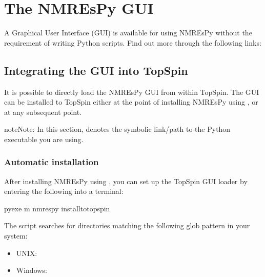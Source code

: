 \documentclass[letterpaper,10pt,english]{sphinxmanual}
\begin{document}
\chapter{The NMR\sphinxhyphen{}EsPy GUI}
\label{\detokenize{gui/index:the-nmr-espy-gui}}\label{\detokenize{gui/index::doc}}
\sphinxAtStartPar
A Graphical User Interface (GUI) is available for using NMR\sphinxhyphen{}EsPy without
the requirement of writing Python scripts. Find out more through the following
links:




\section{Integrating the GUI into TopSpin}
\label{\detokenize{gui/topspin_install:integrating-the-gui-into-topspin}}\label{\detokenize{gui/topspin_install::doc}}
\sphinxAtStartPar
It is possible to directly load the NMR\sphinxhyphen{}EsPy GUI from within TopSpin. The GUI
can be installed to TopSpin either at the point of installing NMR\sphinxhyphen{}EsPy using
, or at any subsequent point.

\begin{sphinxadmonition}{note}{Note:}
\sphinxAtStartPar
In this section,  denotes the symbolic link/path to the Python
executable you are using.
\end{sphinxadmonition}


\subsection{Automatic installation}
\label{\detokenize{gui/topspin_install:automatic-installation}}
\sphinxAtStartPar
After installing NMR\sphinxhyphen{}EsPy using , you can set up the TopSpin
GUI loader by entering the following into a terminal:

\begin{sphinxVerbatim}[commandchars=\\\{\}]
\PYGZdl{} \PYGZlt{}pyexe\PYGZgt{} \PYGZhy{}m nmrespy \PYGZhy{}\PYGZhy{}install\PYGZhy{}to\PYGZhy{}topspin
\end{sphinxVerbatim}

\sphinxAtStartPar
The script searches for directories matching the following glob pattern in your
system:
\begin{itemize}
\item {} 
\sphinxAtStartPar
UNIX: 

\item {} 
\sphinxAtStartPar
Windows: 

\end{itemize}
\end{document}
